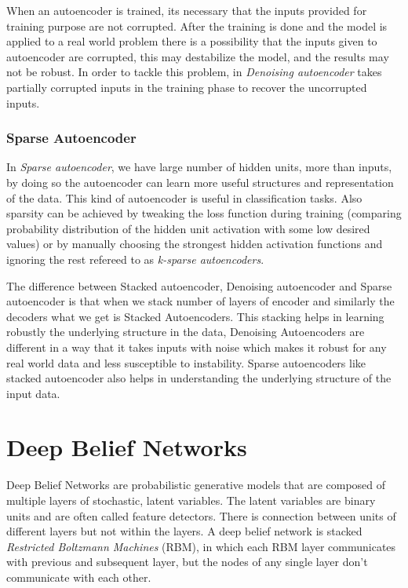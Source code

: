 \documentclass[12pt, a4paper]{report}
\begin{document}
When an autoencoder is trained, its necessary that the inputs provided for training purpose are not corrupted. After the training is done and the model is applied to a real world problem there is a possibility that the inputs given to autoencoder are corrupted, this may destabilize the model, and the results may not be robust. In order to tackle this problem, in \textit{Denoising autoencoder} takes partially corrupted inputs in the training phase to recover the uncorrupted inputs.\\ \par

\subsubsection{Sparse Autoencoder}\label{sec:sparse_autoencoder}

In \textit{Sparse autoencoder}, we have large number of hidden units, more than inputs, by doing so the autoencoder can learn more useful structures and representation of the data. This kind of autoencoder is useful in classification tasks. Also sparsity can be achieved by tweaking the loss function during training (comparing probability distribution of the hidden unit activation with some low desired values) or by manually choosing the strongest hidden activation functions and ignoring the rest refereed to as \textit{k-sparse autoencoders}\cite{ksparseautoencoder}.\\ \par

The difference between Stacked autoencoder, Denoising autoencoder and Sparse autoencoder is that when we stack number of layers of encoder and similarly the decoders what we get is Stacked Autoencoders. This stacking helps in learning robustly the underlying structure in the data, Denoising Autoencoders are different in a way that it takes inputs with noise which makes it robust for any real world data and less susceptible to instability. Sparse autoencoders like stacked autoencoder also helps in understanding the underlying structure of the input data.

\section{Deep Belief Networks}\label{sec:deep_belief_network}

Deep Belief Networks are probabilistic generative models that are composed of multiple layers of stochastic, latent variables. The latent variables are binary units and are often called feature detectors\cite{DBN}. There is connection between units of different layers but not within the layers.
A deep belief network is stacked \textit{Restricted Boltzmann Machines} (RBM), in which each RBM layer communicates with previous and subsequent layer, but the nodes of any single layer don't communicate with each other.
\end{document}
